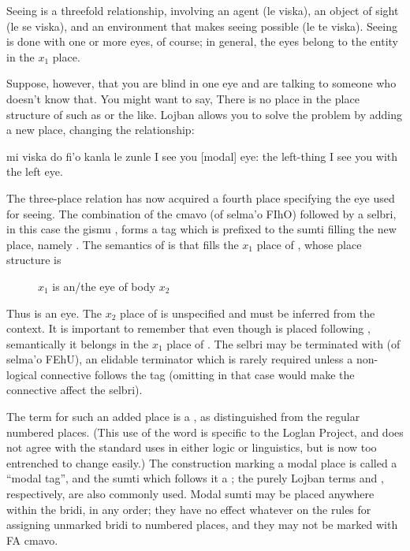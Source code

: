 Seeing is a threefold relationship, involving an agent (le
    viska), an object of sight (le se viska), and an environment
    that makes seeing possible (le te viska). Seeing is done with
    one or more eyes, of course; in general, the eyes belong to the
    entity in the $x_1$ place.

Suppose, however, that you are blind in one eye and are
    talking to someone who doesn't know that. You might want to
    say,  There is no place in the
    place structure of  such as  or the
    like. Lojban allows you to solve the problem by adding a new
    place, changing the relationship:
\begin{example}
mi viska do fi'o kanla  le zunle\n
I see you [modal] eye: the left-thing\n
I see you with the left eye.
\end{example}

The three-place relation  has now acquired a fourth
    place specifying the eye used for seeing. The combination of
    the cmavo  (of selma'o FIhO) followed by a selbri, in
    this case the gismu , forms a tag which is prefixed to
    the sumti filling the new place, namely . The
    semantics of  is that  fills
    the $x_1$ place of , whose place structure is 
\begin{description}
\item[] $x_1$ is an/the eye of body $x_2$
\end{description}

Thus  is an eye. The $x_2$ place of  is
    unspecified and must be inferred from the context. It is
    important to remember that even though  is placed
    following , semantically it belongs in the $x_1$
    place of . The selbri may be terminated with 
    (of selma'o FEhU), an elidable terminator which is rarely
    required unless a non-logical connective follows the tag
    (omitting  in that case would make the connective
    affect the selbri). 

The term for such an added place is a , as
    distinguished from the regular numbered places. (This use of
    the word  is specific to the Loglan Project, and does
    not agree with the standard uses in either logic or
    linguistics, but is now too entrenched to change easily.) The
     construction marking a modal place is called a ``modal
    tag'', and the sumti which follows it a ; the
    purely Lojban terms  and ,
    respectively, are also commonly used. Modal sumti may be placed
    anywhere within the bridi, in any order; they have no effect
    whatever on the rules for assigning unmarked bridi to numbered
    places, and they may not be marked with FA cmavo.

